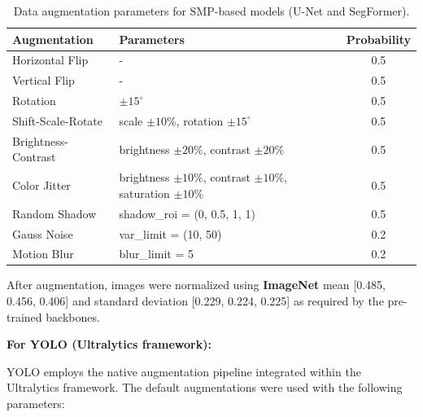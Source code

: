 \begin{table}[h]
    \centering
    \caption{Data augmentation parameters for SMP-based models (U-Net and SegFormer).}
    \label{tab:augmentation_smp}
    \renewcommand{\arraystretch}{1.25}
    \small
    \begin{tabular}{@{}l l c@{}}
        \toprule
        \textbf{Augmentation} & \textbf{Parameters}                                                     & \textbf{Probability} \\
        \midrule
        Horizontal Flip       & -                                                                       & 0.5                  \\
        Vertical Flip         & -                                                                       & 0.5                  \\
        Rotation              & \(\pm 15^\circ\)                                                        & 0.5                  \\
        Shift-Scale-Rotate    & scale \(\pm 10\%\), rotation \(\pm 15^\circ\)                           & 0.5                  \\
        Brightness-Contrast   & brightness \(\pm 20\%\), contrast \(\pm 20\%\)                          & 0.5                  \\
        Color Jitter          & brightness \(\pm 10\%\), contrast \(\pm 10\%\), saturation \(\pm 10\%\) & 0.5                  \\
        Random Shadow         & shadow\_roi = (0, 0.5, 1, 1)                                            & 0.5                  \\
        Gauss Noise           & var\_limit = (10, 50)                                                   & 0.2                  \\
        Motion Blur           & blur\_limit = 5                                                         & 0.2                  \\
        \bottomrule
    \end{tabular}
\end{table}

\hs After augmentation, images were normalized using \textbf{ImageNet} mean [0.485, 0.456, 0.406] and standard deviation [0.229, 0.224, 0.225] as required by the pre-trained backbones.

\textbf{For YOLO (Ultralytics framework):}

\hs YOLO employs the native augmentation pipeline integrated within the Ultralytics framework. The default augmentations were used with the following parameters:

